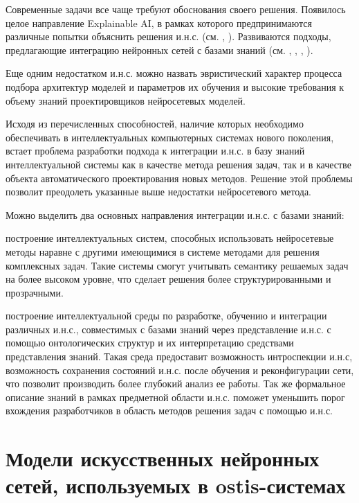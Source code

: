 Современные задачи все чаще требуют обоснования своего решения. Появилось целое направление Explainable AI, в рамках которого предпринимаются различные попытки объяснить решения и.н.с. (см. , ). Развиваются подходы, предлагающие интеграцию нейронных сетей с базами знаний (см. , , , ).

Еще одним недостатком и.н.с. можно назвать эвристический характер процесса подбора архитектур моделей и параметров их обучения и высокие требования к объему знаний проектировщиков нейросетевых моделей.

Исходя из перечисленных способностей, наличие которых необходимо обеспечивать в интеллектуальных компьютерных системах нового поколения, встает проблема разработки подхода к интеграции и.н.с. в базу знаний интеллектуальной системы как в качестве метода решения задач, так и в качестве объекта автоматического проектирования новых методов. Решение этой проблемы позволит преодолеть указанные выше недостатки нейросетевого метода.

Можно выделить два основных направления интеграции и.н.с. с базами знаний:
\begin{textitemize}
	\item построение интеллектуальных систем, способных использовать нейросетевые методы наравне с другими имеющимися в системе методами для решения комплексных задач. Такие системы смогут учитывать семантику решаемых задач на более высоком уровне, что сделает решения более структурированными и прозрачными.
	\item построение интеллектуальной среды по разработке, обучению и интеграции различных и.н.с., совместимых с базами знаний через представление и.н.с. с помощью онтологических структур и их интерпретацию средствами представления знаний. Такая среда предоставит возможность интроспекции и.н.с, возможность сохранения состояний и.н.с. после обучения и реконфигурации сети, что позволит производить более глубокий анализ ее работы. Так же формальное описание знаний в рамках предметной области и.н.с. поможет уменьшить порог вхождения разработчиков в область методов решения задач с помощью и.н.с.
\end{textitemize}


\section{Модели искусственных нейронных сетей, используемых в ostis-системах}
\label{sec_chapter_ann_models}

